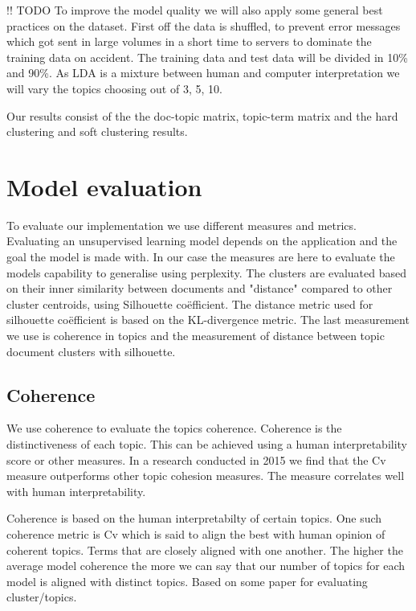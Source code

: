 !! TODO To improve the model quality we will also apply some general best practices on the dataset. First off the data is shuffled, to prevent error messages which got sent in large volumes in a short time to servers to dominate the training data on accident. The training data and test data will be divided in 10\% and 90\%. As LDA is a mixture between human and computer interpretation we will vary the topics choosing out of 3, 5, 10. 

Our results consist of the the doc-topic matrix, topic-term matrix and the hard clustering and soft clustering results.

\section{Model evaluation}\label{methodology:evaluation measures}
To evaluate our implementation we use different measures and metrics. Evaluating an unsupervised learning model depends on the application and the goal the model is made with. In our case the measures are here to evaluate the models capability to generalise using perplexity. The clusters are evaluated based on their inner similarity between documents and "distance" compared to other cluster centroids, using Silhouette co\"efficient. The distance metric used for silhouette co\"efficient is based on the KL-divergence metric. The last measurement we use is coherence in topics and the measurement of distance between topic document clusters with silhouette.

\subsection{Coherence}\label{methodology:coherence c_v}
We use coherence to evaluate the topics coherence. Coherence is the distinctiveness of each topic. This can be achieved using a human interpretability score \cite{Chang2009} or other measures. In a research conducted in 2015 we find that the Cv measure outperforms other topic cohesion measures. The measure correlates well with human interpretability. \cite{Roder2015}

Coherence is based on the human interpretabilty of certain topics. One such coherence metric is Cv which is said to align the best with human opinion of coherent topics. Terms that are closely aligned with one another. The higher the average model coherence the more we can say that our number of topics for each model is aligned with distinct topics. Based on some paper for evaluating cluster/topics.
\cite{Roder2015}



